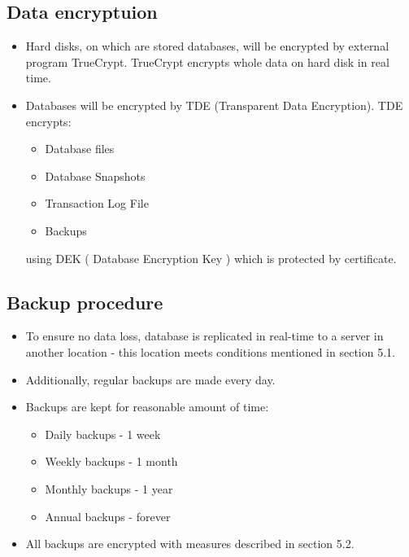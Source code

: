 \subsection{Data encryptuion}

\begin{itemize}
	\item Hard disks, on which are stored databases, will be encrypted by external program TrueCrypt. TrueCrypt encrypts whole data on hard disk in real time. 
	\item Databases will be encrypted by TDE (Transparent Data Encryption). TDE encrypts:
        \begin{itemize}
			\item Database files
			\item Database Snapshots
			\item Transaction Log File
            \item Backups
		\end{itemize}
	using DEK ( Database Encryption Key ) which is protected by certificate.
\end{itemize}

\subsection{Backup procedure}
\begin{itemize}
	\item To ensure no data loss, database is replicated in real-time to a server in another location - this location meets conditions mentioned in section 5.1.
	\item Additionally, regular backups are made every day.
	\item Backups are kept for reasonable amount of time:
        \begin{itemize}
			\item Daily backups - 1 week
			\item Weekly backups - 1 month
			\item Monthly backups - 1 year
			\item Annual backups - forever
		\end{itemize}
	\item All backups are encrypted with measures described in section 5.2.
\end{itemize}